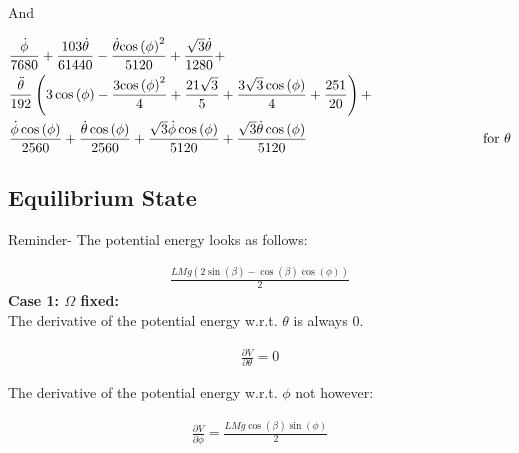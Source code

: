 And

\begin{equation}
    \begin{split}
        &\frac{\mathrm{\dot\phi}}{7680}+\frac{103\dot\theta}{61440}-\frac{\dot\theta{\cos\left(\phi \right)}^2}{5120}+\frac{\sqrt{3}\dot\theta}{1280}+\\
        &\frac{\mathrm{\ddot\theta}}{192}\left(3\cos\left(\phi \right)-\frac{3{\cos\left(\phi \right)}^2}{4}+\frac{21\sqrt{3}}{5}+\frac{3\sqrt{3}\cos\left(\phi \right)}{4}+\frac{251}{20}\right)+\\
        &\frac{\mathrm{\dot\phi}\cos\left(\phi \right)}{2560}+\frac{\dot\theta\cos\left(\phi \right)}{2560}+\frac{\sqrt{3}\mathrm{\dot\phi}\cos\left(\phi \right)}{5120}+\frac{\sqrt{3}\dot\theta\cos\left(\phi \right)}{5120}\hspace{45mm}\text{for } \theta
    \end{split}
\end{equation}

\subsection{Equilibrium State}

Reminder- The potential energy looks as follows:

\begin{equation}
    \begin{split}
        \frac{LMg\left(2\sin\left(\beta \right)-\cos\left(\beta \right)\cos\left(\phi \right)\right)}{2}
    \end{split}
\end{equation}
\textbf{Case 1: $\Omega$ fixed:} \vspace{0.5cm}\\

The derivative of the potential energy w.r.t. $\theta$ is always 0.

\begin{equation}
    \begin{split}
        \frac{\partial V}{\partial \theta} = 0
    \end{split}
\end{equation}

The derivative of the potential energy w.r.t. $\phi$ not however:

\begin{equation}
    \begin{split}
        \frac{\partial V}{\partial \phi} = \frac{LMg\cos\left(\beta \right)\sin\left(\phi \right)}{2}
    \end{split}
\end{equation}

